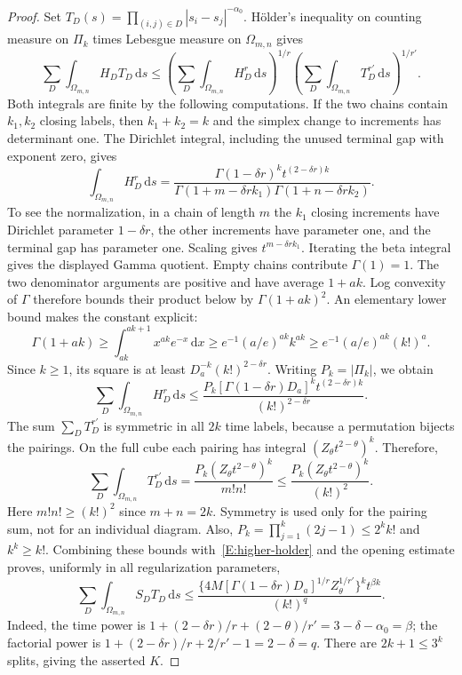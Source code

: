 \documentclass[12pt]{article}
\numberwithin{equation}{section}
\theoremstyle{definition}
\newcommand{\ud}{\,\mathrm{d}}
\begin{document}
\begin{proof}
  Set $T_D(s)=\prod_{(i,j)\in D}|s_i-s_j|^{-\alpha_0}$.
  H\"older's inequality on counting measure on $\Pi_k$ times Lebesgue
  measure on $\Omega_{m,n}$ gives
  \begin{equation}\label{E:higher-holder}
    \sum_D\int_{\Omega_{m,n}}H_DT_D\ud s
    \le\left(\sum_D\int_{\Omega_{m,n}}H_D^r\ud s\right)^{1/r}
    \left(\sum_D\int_{\Omega_{m,n}}T_D^{r'}\ud s\right)^{1/r'}.
  \end{equation}
  Both integrals are finite by the following computations. If the two
  chains contain $k_1,k_2$ closing labels, then $k_1+k_2=k$ and the
  simplex change to increments has determinant one. The Dirichlet
  integral, including the unused terminal gap with exponent zero, gives
  \[
    \int_{\Omega_{m,n}}H_D^r\ud s
    =\frac{\Gamma(1-\delta r)^k t^{(2-\delta r)k}}
    {\Gamma(1+m-\delta r k_1)\Gamma(1+n-\delta r k_2)}.
  \]
  To see the normalization, in a chain of length $m$ the $k_1$ closing
  increments have Dirichlet parameter $1-\delta r$, the other increments
  have parameter one, and the terminal gap has parameter one. Scaling
  gives $t^{m-\delta r k_1}$. Iterating the beta integral gives the
  displayed Gamma quotient. Empty chains contribute $\Gamma(1)=1$.
  The two denominator arguments are positive and have average $1+ak$.
  Log convexity of $\Gamma$ therefore bounds their product below by
  $\Gamma(1+ak)^2$. An elementary lower bound makes the constant explicit:
  \[
    \Gamma(1+ak)\ge\int_{ak}^{ak+1}x^{ak}e^{-x}\ud x
    \ge e^{-1}(a/e)^{ak}k^{ak}
    \ge e^{-1}(a/e)^{ak}(k!)^a.
  \]
  Since $k\ge1$, its square is at least
  $D_a^{-k}(k!)^{2-\delta r}$. Writing $P_k=|\Pi_k|$, we obtain
  \[
    \sum_D\int_{\Omega_{m,n}}H_D^r\ud s
    \le\frac{P_k[\Gamma(1-\delta r)D_a]^k
    t^{(2-\delta r)k}}{(k!)^{2-\delta r}}.
  \]
  The sum $\sum_DT_D^{r'}$ is symmetric in all $2k$ time labels,
  because a permutation bijects the pairings. On the full cube each
  pairing has integral $(Z_\theta t^{2-\theta})^k$. Therefore,
  \[
    \sum_D\int_{\Omega_{m,n}}T_D^{r'}\ud s
    =\frac{P_k(Z_\theta t^{2-\theta})^k}{m!n!}
    \le\frac{P_k(Z_\theta t^{2-\theta})^k}{(k!)^2}.
  \]
  Here $m!n!\ge(k!)^2$ since $m+n=2k$. Symmetry is used only for
  the pairing sum, not for an individual diagram. Also,
  $P_k=\prod_{j=1}^k(2j-1)\le2^kk!$ and $k^k\ge k!$.
  Combining these bounds with~\eqref{E:higher-holder} and the opening
  estimate proves, uniformly in all regularization parameters,
  \[
    \sum_D\int_{\Omega_{m,n}}S_D T_D\ud s
    \le\frac{\{4M[\Gamma(1-\delta r)D_a]^{1/r}
    Z_\theta^{1/r'}\}^k t^{\beta k}}{(k!)^q}.
  \]
  Indeed, the time power is
  $1+(2-\delta r)/r+(2-\theta)/r'=3-\delta-\alpha_0=\beta$;
  the factorial power is
  $1+(2-\delta r)/r+2/r'-1=2-\delta=q$.
  There are $2k+1\le3^k$ splits, giving the asserted $K$.


\end{proof}
\end{document}

